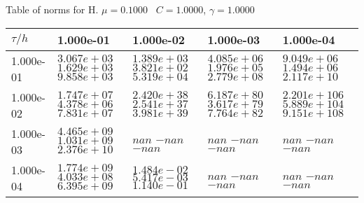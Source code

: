 \begin{center}
Table of norms for H. $\mu = 0.1000$ \, $C = 1.0000$, $\gamma = 1.0000$
  
\begin{tabular}{|p{1in}|p{1in}|p{1in}|p{1in}|p{1in}|} \hline
$\tau / h$ &1.000e-01 &1.000e-02 &1.000e-03 &1.000e-04 \\ \hline 
1.000e-01 & $3.067e+03$  $1.629e+03$  $9.858e+03$  & $1.389e+03$  $3.821e+02$  $5.319e+04$  & $4.085e+06$  $1.976e+05$  $2.779e+08$  & $9.049e+06$  $1.494e+06$  $2.117e+10$  \\ \hline 
1.000e-02 & $1.747e+07$  $4.378e+06$  $7.831e+07$  & $2.420e+38$  $2.541e+37$  $3.981e+39$  & $6.187e+80$  $3.617e+79$  $7.764e+82$  & $2.201e+106$  $5.889e+104$  $9.151e+108$  \\ \hline 
1.000e-03 & $4.465e+09$  $1.031e+09$  $2.376e+10$  & $nan$  $-nan$  $-nan$  & $nan$  $-nan$  $-nan$  & $nan$  $-nan$  $-nan$  \\ \hline 
1.000e-04 & $1.774e+09$  $4.033e+08$  $6.395e+09$  & $1.484e-02$  $5.417e-03$  $1.140e-01$  & $nan$  $-nan$  $-nan$  & $nan$  $-nan$  $-nan$  \\ \hline 

\end{tabular}\\[20pt]
\end{center}
